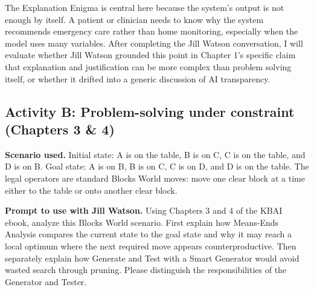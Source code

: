 \documentclass[
	letterpaper, %
]{jdf}
\begin{document}
The Explanation Enigma is central here because the system's output is not enough by itself. A patient or clinician needs to know why the system recommends emergency care rather than home monitoring, especially when the model uses many variables. After completing the Jill Watson conversation, I will evaluate whether Jill Watson grounded this point in Chapter 1's specific claim that explanation and justification can be more complex than problem solving itself, or whether it drifted into a generic discussion of AI transparency.

\subsection{Activity B: Problem-solving under constraint (Chapters 3 \& 4)}

%
%
%

\textbf{Scenario used.} Initial state: A is on the table, B is on C, C is on the table, and D is on B. Goal state: A is on B, B is on C, C is on D, and D is on the table. The legal operators are standard Blocks World moves: move one clear block at a time either to the table or onto another clear block.

\textbf{Prompt to use with Jill Watson.} Using Chapters 3 and 4 of the KBAI ebook, analyze this Blocks World scenario. First explain how Means-Ends Analysis compares the current state to the goal state and why it may reach a local optimum where the next required move appears counterproductive. Then separately explain how Generate and Test with a Smart Generator would avoid wasted search through pruning. Please distinguish the responsibilities of the Generator and Tester.
\end{document}
